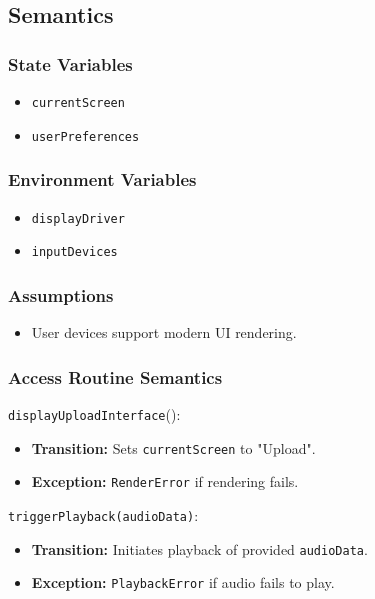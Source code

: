 \documentclass[12pt, titlepage]{article}
\begin{document}
\subsection{Semantics}  

\subsubsection{State Variables}  
\begin{itemize}  
    \item \texttt{currentScreen}  
    \item \texttt{userPreferences}  
\end{itemize}  

\subsubsection{Environment Variables}  
\begin{itemize}  
    \item \texttt{displayDriver}  
    \item \texttt{inputDevices}  
\end{itemize}  

\subsubsection{Assumptions}  
\begin{itemize}  
    \item User devices support modern UI rendering.  
\end{itemize}  

\subsubsection{Access Routine Semantics}  

\noindent \texttt{displayUploadInterface}():
\begin{itemize}  
    \item \textbf{Transition:} Sets \texttt{currentScreen} to "Upload".  
    \item \textbf{Exception:} \texttt{RenderError} if rendering fails.  
\end{itemize}  

\noindent \texttt{triggerPlayback(audioData)}:
\begin{itemize}  
    \item \textbf{Transition:} Initiates playback of provided \texttt{audioData}.  
    \item \textbf{Exception:} \texttt{PlaybackError} if audio fails to play.  
\end{itemize}  
\end{document}
